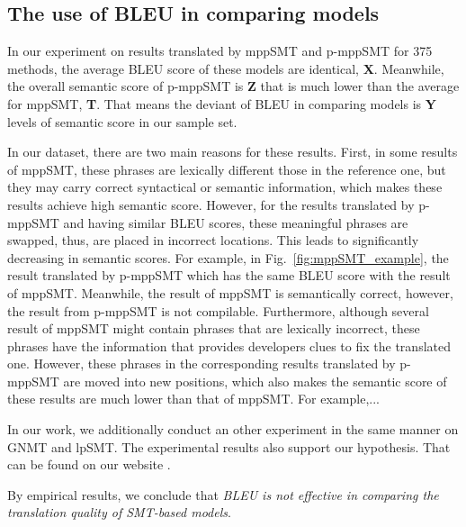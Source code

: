 \subsection{The use of BLEU in comparing models}

In our experiment on results translated by mppSMT and p-mppSMT for 375 methods, 
the average BLEU score of these models are identical, \textbf{X}. Meanwhile, 
the overall semantic score of p-mppSMT is \textbf{Z} that is much lower than the 
average for mppSMT, \textbf{T}. That means the deviant of BLEU in comparing 
models is \textbf{Y} levels of semantic score in our sample set. 

In our dataset, there are two main reasons for these results. First,
in some results of mppSMT, these phrases are lexically different those
in the reference one, but they may carry correct syntactical or
semantic information, which makes these results achieve high semantic
score. However, for the results translated by p-mppSMT and having
similar BLEU scores, these meaningful phrases are swapped, thus, are
placed in incorrect locations. This leads to significantly decreasing
in semantic scores. For example, in Fig.~\ref{fig:mppSMT_example}, the
result translated by p-mppSMT which has the same BLEU score with the
result of mppSMT. Meanwhile, the result of mppSMT is semantically
correct, however, the result from p-mppSMT is not compilable.
%
Furthermore, although several result of mppSMT might contain phrases
that are lexically incorrect, these phrases have the information that
provides developers clues to fix the translated one. However, these
phrases in the corresponding results translated by p-mppSMT are moved
into new positions, which also makes the semantic score of these
results are much lower than that of mppSMT. For example,...

In our work, we additionally conduct an other experiment in the same
manner on GNMT and lpSMT.  The experimental results also support our
hypothesis. That can be found on our website \cite{??}.

By empirical results, we conclude that \textit{BLEU is not effective
  in comparing the translation quality of SMT-based models}.



